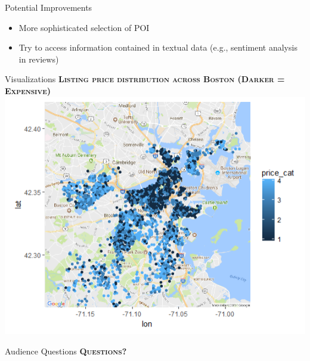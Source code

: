 \documentclass[10pt]{beamer}
\begin{document}
    \begin{frame}{Potential Improvements}
    	\begin{itemize}
          \item More sophisticated selection of POI
          \item Try to access information contained in textual data (e.g., sentiment analysis in reviews)
        \end{itemize}
        
    \end{frame}
    
        
    \begin{frame}{Visualizations}
    	\textbf{\textsc{Listing price distribution across Boston (Darker = Expensive)}}
    	 \includegraphics[width=\textwidth,scale=.7]{price_map.PNG} \\
    \end{frame}
    
    \begin{frame}{Audience Questions}
    	\textbf{\textsc{Questions?}} 
        
    \end{frame}
\end{document}
